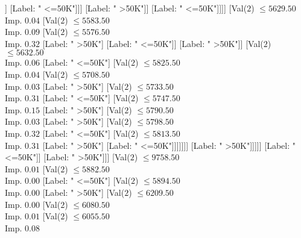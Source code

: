 \documentclass[margin=10pt]{standalone}
\begin{document}
\begin{forest}
																												[Label: " <=50K"]
																												[Label: " >50K"]]
																											[Label: " <=50K"]]]
																									[Label: " >50K"]]
																								[Label: " <=50K"]]]]
																					[Val($2$) $ \leq 5629.50$ \\ Imp. $0.04$
																						[Val($2$) $ \leq 5583.50$ \\ Imp. $0.09$
																							[Val($2$) $ \leq 5576.50$ \\ Imp. $0.32$
																								[Label: " >50K"]
																								[Label: " <=50K"]]
																							[Label: " >50K"]]
																						[Val($2$) $ \leq 5632.50$ \\ Imp. $0.06$
																							[Label: " <=50K"]
																							[Val($2$) $ \leq 5825.50$ \\ Imp. $0.04$
																								[Val($2$) $ \leq 5708.50$ \\ Imp. $0.03$
																									[Label: " >50K"]
																									[Val($2$) $ \leq 5733.50$ \\ Imp. $0.31$
																										[Label: " <=50K"]
																										[Val($2$) $ \leq 5747.50$ \\ Imp. $0.15$
																											[Label: " >50K"]
																											[Val($2$) $ \leq 5790.50$ \\ Imp. $0.03$
																												[Label: " >50K"]
																												[Val($2$) $ \leq 5798.50$ \\ Imp. $0.32$
																													[Label: " <=50K"]
																													[Val($2$) $ \leq 5813.50$ \\ Imp. $0.31$
																														[Label: " >50K"]
																														[Label: " <=50K"]]]]]]]
																								[Label: " >50K"]]]]]
																				[Label: " <=50K"]]
																			[Label: " >50K"]]]
																	[Val($2$) $ \leq 9758.50$ \\ Imp. $0.01$
																		[Val($2$) $ \leq 5882.50$ \\ Imp. $0.00$
																			[Label: " <=50K"]
																			[Val($2$) $ \leq 5894.50$ \\ Imp. $0.00$
																				[Label: " >50K"]
																				[Val($2$) $ \leq 6209.50$ \\ Imp. $0.00$
																					[Val($2$) $ \leq 6080.50$ \\ Imp. $0.01$
																						[Val($2$) $ \leq 6055.50$ \\ Imp. $0.08$

\end{forest}
\end{document}
